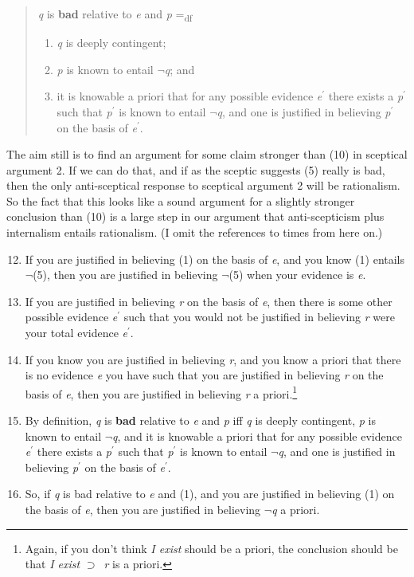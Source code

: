\begin{quote}
\emph{q} is \textbf{bad} relative to \emph{e} and \emph{p}
=\textsubscript{df}

\begin{enumerate}
\item
  \emph{q} is deeply contingent;
\item
  \emph{p} is known to entail \(\neg\)\emph{q}; and
\item
  it is knowable a priori that for any possible evidence
  \emph{e}\(^\prime\) there exists a \emph{p}\(^\prime\) such that
  \emph{p}\(^\prime\) is known to entail \(\neg\)\emph{q}, and one is
  justified in believing \emph{p}\(^\prime\) on the basis of
  \emph{e}\(^\prime\).
\end{enumerate}
\end{quote}

The aim still is to find an argument for some claim stronger than (10)
in sceptical argument 2. If we can do that, and if as the sceptic
suggests (5) really is bad, then the only anti-sceptical response to
sceptical argument 2 will be rationalism. So the fact that this looks
like a sound argument for a slightly stronger conclusion than (10) is a
large step in our argument that anti-scepticism plus internalism entails
rationalism. (I omit the references to times from here on.)

\begin{enumerate}
\setcounter{enumi}{11}
\item
  If you are justified in believing (1) on the basis of \emph{e}, and
  you know (1) entails \(\neg\)(5), then you are justified in believing
  \(\neg\)(5) when your evidence is \emph{e}.
\item
  If you are justified in believing \emph{r} on the basis of \emph{e},
  then there is some other possible evidence \emph{e}\(^\prime\) such
  that you would not be justified in believing \emph{r} were your total
  evidence \emph{e}\(^\prime\).
\item
  If you know you are justified in believing \emph{r}, and you know a
  priori that there is no evidence \emph{e} you have such that you are
  justified in believing \emph{r} on the basis of \emph{e}, then you are
  justified in believing \emph{r} a priori.\footnote{Again, if you don't
    think \emph{I exist} should be a priori, the conclusion should be
    that \emph{I exist} \({\supset}\)~\emph{r} is a priori.}
\item
  By definition, \emph{q} is \textbf{bad} relative to \emph{e} and
  \emph{p} iff \emph{q} is deeply contingent, \emph{p} is known to
  entail \(\neg\)\emph{q}, and it is knowable a priori that for any
  possible evidence \emph{e}\(^\prime\) there exists a
  \emph{p}\(^\prime\) such that \emph{p}\(^\prime\) is known to entail
  \(\neg\)\emph{q}, and one is justified in believing
  \emph{p}\(^\prime\) on the basis of \emph{e}\(^\prime\).
\item
  So, if \emph{q} is bad relative to \emph{e} and (1), and you are
  justified in believing (1) on the basis of \emph{e}, then you are
  justified in believing \(\neg\)\emph{q} a priori.
\end{enumerate}

